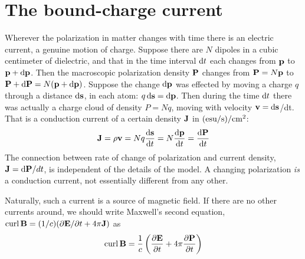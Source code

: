 \section{The bound-charge current}

Wherever the polarization in matter changes with time there is
an electric current, a genuine motion of charge. Suppose there are
$N$ dipoles in a cubic centimeter of dielectric, and that in the time
interval $\operatorname{d\!} t$ each changes from $\mathbf{p}$ to $\mathbf{p} + \operatorname{d\!}\mathbf{p}$. Then the macroscopic
polarization density $\mathbf{P}$ changes from $\mathbf{P} = N\mathbf{p}$ to 
$\mathbf{P} + \operatorname{d\!} \mathbf{P}= N (\mathbf{p} + \operatorname{d\!}\mathbf{p})$.
Suppose the change $\operatorname{d\!}\mathbf{p}$ was effected by moving a charge $q$ through a
distance $\operatorname{d\!}\mathbf{s}$, in each atom:  $q \operatorname{d\!}\mathbf{s} = \operatorname{d\!}\mathbf{p}$.
Then during the time $\operatorname{d\!} t$ there
was actually a charge cloud of density $P = Nq$, moving with velocity
$\mathbf{v} = \operatorname{d\!}\mathbf{s}$/dt. That is a conduction current of a certain density $\mathbf{J}$ in
$(\textup{esu}/\textup{s})/\textup{cm}^2$:
\begin{equation}
  \mathbf{J} = \rho\mathbf{v} = Nq\frac{\operatorname{d\!}\mathbf{s}}{\operatorname{d\!} t} = N\frac{\operatorname{d\!}\mathbf{p}}{\operatorname{d\!} t} = \frac{\operatorname{d\!}\mathbf{P}}{\operatorname{d\!} t}
\end{equation}
The connection between rate of change of polarization and current
density, $\mathbf{J} = \operatorname{d\!}\mathbf{P}/dt$, is independent of the details of the model. A
changing polarization \emph{is} a conduction current, not essentially different
from any other.

Naturally, such a current is a source of magnetic field. If there
are no other currents around, we should write Maxwell's second
equation, $\operatorname{curl}\mathbf{B} = (1/c) (\partial\mathbf{E}/\partial t + 4\pi\mathbf{J})$ as
\begin{equation}
  \operatorname{curl}\mathbf{B} = \frac{1}{c} \left(\frac{\partial\mathbf{E}}{\partial t} + 4\pi\frac{\partial\mathbf{P}}{\partial t}\right)
\end{equation}

